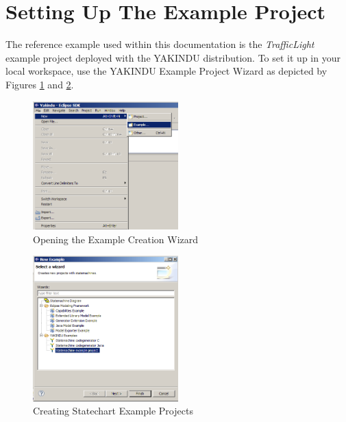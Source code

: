 %
\section{Setting Up The Example Project}

The reference example used within this documentation is the \emph{TrafficLight}
example project deployed with the YAKINDU distribution. To set it up in your
local workspace, use the YAKINDU Example Project Wizard as depicted by Figures
\ref{fig:screenshot1} and \ref{fig:screenshot2}. 
\begin{figure}[h!] 
\center
\includegraphics[width=0.5\textwidth]{./Pictures/Screenshot1}
\caption{\label{fig:screenshot1} Opening the Example Creation Wizard}
\end{figure}

\begin{figure}[h!]
\center
\includegraphics[width=0.5\textwidth]{./Pictures/Screenshot2}
\caption{\label{fig:screenshot2} Creating Statechart Example Projects}
\end{figure}


